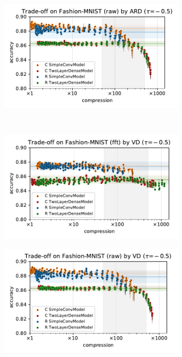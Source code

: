 \documentclass[a4paper,10pt,onecolumn]{article}
\begin{document}
\begin{figure}[b]
\begin{subfigure}[b]{0.5\columnwidth}
  \end{subfigure}%
  \begin{subfigure}[b]{0.5\columnwidth}
    \centering
    \includegraphics[width=\columnwidth]{figure__mnist-like__trade-off/appendix__ARD__fashionmnist__raw__-0.5.pdf}
  \end{subfigure} \\ %
  \begin{subfigure}[b]{0.5\columnwidth}
    \centering
    \includegraphics[width=\columnwidth]{figure__mnist-like__trade-off/appendix__VD__fashionmnist__fft__-0.5.pdf}
  \end{subfigure}%
  \begin{subfigure}[b]{0.5\columnwidth}
    \centering
    \includegraphics[width=\columnwidth]{figure__mnist-like__trade-off/appendix__VD__fashionmnist__raw__-0.5.pdf}

\end{subfigure}
\end{figure}
\end{document}
